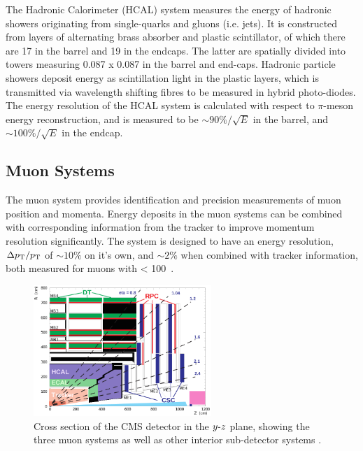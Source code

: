 The Hadronic Calorimeter (HCAL) system measures the energy of hadronic showers 
originating from single-quarks and gluons (i.e. jets). It is constructed from
layers of alternating brass absorber and plastic scintillator, of which there
are 17 in the barrel and 19 in the endcaps. The latter are spatially
divided into towers measuring 0.087 x 0.087 in the barrel and end-caps. Hadronic
particle showers deposit energy as scintillation light in the plastic layers,
which is transmitted via wavelength shifting fibres to be measured in hybrid
photo-diodes. The energy resolution of the HCAL system is calculated with
respect to $\pi$-meson energy reconstruction, and is measured to be
$\sim 90\%/\sqrt{E}$ in the barrel, and $\sim 100\%/\sqrt{E}$ in the endcap.


\subsection{Muon Systems}


The muon system provides identification and precision measurements of
muon position and momenta. Energy deposits in the muon systems can be combined
with corresponding information from the tracker to improve momentum resolution
significantly. The system is designed to have an energy resolution,
$\Delta {p_{\text T}}/{p_{\text T}}$ of
$\sim10\%$ on it's own, and $\sim2\%$ when combined with tracker information,
both measured for muons with \Pt < 100~\gev.

\begin{figure}[ht!]
\centering
\includegraphics[width=0.6\textwidth]{Figs/machine/pictures_MuonSys-mod3.png}
\caption{Cross section of the CMS detector in the $y{\hbox{-}} z$ plane,
showing the three muon systems as well as other interior sub-detector systems
\cite{Bayatian:922757}.}
\label{fig:muon_system_diagram}
\end{figure}


